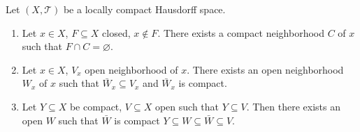 \begin{propositionenv}\label{prop:5.3.4}
    Let $(X,\mathscr{T})$ be a locally compact Hausdorff space.
    \begin{enumerate}[label=(\arabic*)]
        \item Let $x \in X$, $F \subseteq X$ closed, $x \notin F$.
            There exists a compact neighborhood $C$ of $x$ such that $F \cap C = \varnothing$.
        \item Let $x \in X$, $V_x$ open neighborhood of $x$.
            There exists an open neighborhood $W_x$ of $x$ such that $\bar{W}_x \subseteq V_x$ and $\bar{W}_x$ is compact.
        \item Let $Y \subseteq X$ be compact, $V \subseteq X$ open such that $Y \subseteq V$.
            Then there exists an open $W$ such that $\bar{W}$ is compact
            $Y \subseteq W \subseteq \bar{W} \subseteq V.$
    \end{enumerate}
\end{propositionenv}
